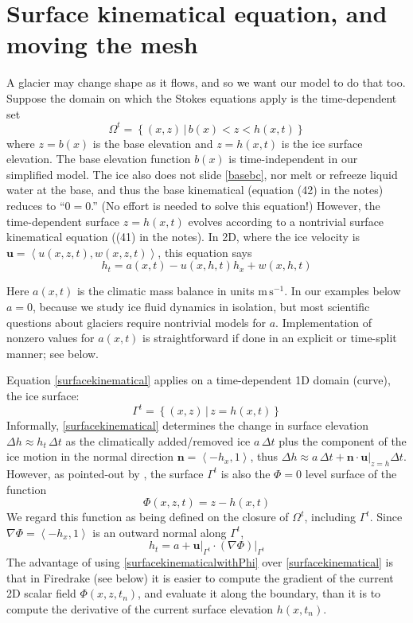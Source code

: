 \documentclass[letterpaper,final,12pt,reqno]{amsart}
\newcommand{\grad}{\nabla}
\newcommand{\bn}{\mathbf{n}}
\newcommand{\bu}{\mathbf{u}}
\begin{document}
\section{Surface kinematical equation, and moving the mesh}

A glacier may change shape as it flows, and so we want our model to do that too.  Suppose the domain on which the Stokes equations apply is the time-dependent set
\begin{equation}
\Omega^t = \left\{(x,z)\,\big|\, b(x) < z < h(x,t)\right\}  \label{Omegat}
\end{equation}
where $z=b(x)$ is the base elevation and $z=h(x,t)$ is the ice surface elevation.  The base elevation function $b(x)$ is time-independent in our simplified model.  The ice also does not slide \eqref{basebc}, nor melt or refreeze liquid water at the base, and thus the base kinematical (equation (42) in the notes) reduces to ``$0=0$.''  (No effort is needed to solve this equation!)  However, the time-dependent surface $z=h(x,t)$ evolves according to a nontrivial surface kinematical equation ((41) in the notes).  In 2D, where the ice velocity is $\bu=\left<u(x,z,t),w(x,z,t)\right>$, this equation says
\begin{equation}
h_t = a(x,t) - u(x,h,t) h_x + w(x,h,t) \label{surfacekinematical}
\end{equation}

Here $a(x,t)$ is the climatic mass balance in units $\text{m}\,\text{s}^{-1}$.  In our examples below $a=0$, because we study ice fluid dynamics in isolation, but most scientific questions about glaciers require nontrivial models for $a$.  Implementation of nonzero values for $a(x,t)$ is straightforward if done in an explicit or time-split manner; see below.

Equation \eqref{surfacekinematical} applies on a time-dependent 1D domain (curve), the ice surface:
    $$\Gamma^t = \left\{(x,z) \,\big|\, z = h(x,t)\right\}$$
Informally, \eqref{surfacekinematical} determines the change in surface elevation $\Delta h \approx h_t\,\Delta t$ as the climatically added/removed ice $a\,\Delta t$ plus the component of the ice motion in the normal direction $\bn = \left<-h_x,1\right>$, thus $\Delta h \approx a \,\Delta t + \bn\cdot \bu\big|_{z=h} \Delta t$.  However, as pointed-out by \cite[pp.~65--66]{GreveBlatter2009}, the surface $\Gamma^t$ is also the $\Phi=0$ level surface of the function
    $$\Phi(x,z,t) = z - h(x,t)$$
We regard this function as being defined on the closure of $\Omega^t$, including $\Gamma^t$.  Since $\grad \Phi = \left<-h_x,1\right>$ is an outward normal along $\Gamma^t$,
\begin{equation}
h_t = a + \bu\big|_{\Gamma^t} \cdot (\grad \Phi)\big|_{\Gamma^t} \label{surfacekinematicalwithPhi}
\end{equation}
The advantage of using \eqref{surfacekinematicalwithPhi} over \eqref{surfacekinematical} is that in Firedrake (see below) it is easier to compute the gradient of the current 2D scalar field $\Phi(x,z,t_n)$, and evaluate it along the boundary, than it is to compute the derivative of the current surface elevation $h(x,t_n)$.
\end{document}
